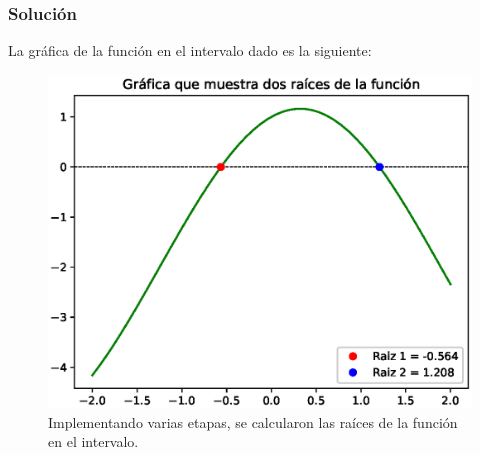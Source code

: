 \documentclass[12pt]{beamer}
\begin{document}
\begin{frame}
\frametitle{Solución}
La gráfica de la función en el intervalo dado es la siguiente:
\begin{figure}
	\centering
	\includegraphics[scale=0.4]{Imagenes/Ejercicio_NR_Seno_02.eps}
	\caption{Implementando varias etapas, se calcularon las raíces de la función en el intervalo.}
\end{figure}
\end{frame}
\end{document}
